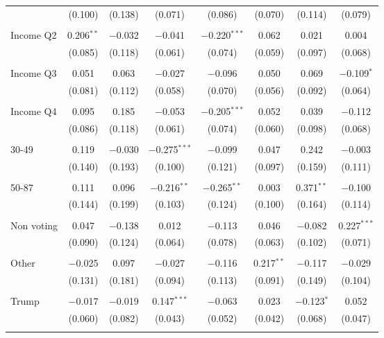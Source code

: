 \begin{tabular}{@{\extracolsep{5pt}}lccccccc}
  & (0.100) & (0.138) & (0.071) & (0.086) & (0.070) & (0.114) & (0.079) \\ 
  & & & & & & & \\ 
 Income Q2 & 0.206$^{**}$ & $-$0.032 & $-$0.041 & $-$0.220$^{***}$ & 0.062 & 0.021 & 0.004 \\ 
  & (0.085) & (0.118) & (0.061) & (0.074) & (0.059) & (0.097) & (0.068) \\ 
  & & & & & & & \\ 
 Income Q3 & 0.051 & 0.063 & $-$0.027 & $-$0.096 & 0.050 & 0.069 & $-$0.109$^{*}$ \\ 
  & (0.081) & (0.112) & (0.058) & (0.070) & (0.056) & (0.092) & (0.064) \\ 
  & & & & & & & \\ 
 Income Q4 & 0.095 & 0.185 & $-$0.053 & $-$0.205$^{***}$ & 0.052 & 0.039 & $-$0.112 \\ 
  & (0.086) & (0.118) & (0.061) & (0.074) & (0.060) & (0.098) & (0.068) \\ 
  & & & & & & & \\ 
 30-49 & 0.119 & $-$0.030 & $-$0.275$^{***}$ & $-$0.099 & 0.047 & 0.242 & $-$0.003 \\ 
  & (0.140) & (0.193) & (0.100) & (0.121) & (0.097) & (0.159) & (0.111) \\ 
  & & & & & & & \\ 
 50-87 & 0.111 & 0.096 & $-$0.216$^{**}$ & $-$0.265$^{**}$ & 0.003 & 0.371$^{**}$ & $-$0.100 \\ 
  & (0.144) & (0.199) & (0.103) & (0.124) & (0.100) & (0.164) & (0.114) \\ 
  & & & & & & & \\ 
 Non voting & 0.047 & $-$0.138 & 0.012 & $-$0.113 & 0.046 & $-$0.082 & 0.227$^{***}$ \\ 
  & (0.090) & (0.124) & (0.064) & (0.078) & (0.063) & (0.102) & (0.071) \\ 
  & & & & & & & \\ 
 Other & $-$0.025 & 0.097 & $-$0.027 & $-$0.116 & 0.217$^{**}$ & $-$0.117 & $-$0.029 \\ 
  & (0.131) & (0.181) & (0.094) & (0.113) & (0.091) & (0.149) & (0.104) \\ 
  & & & & & & & \\ 
 Trump & $-$0.017 & $-$0.019 & 0.147$^{***}$ & $-$0.063 & 0.023 & $-$0.123$^{*}$ & 0.052 \\ 
  & (0.060) & (0.082) & (0.043) & (0.052) & (0.042) & (0.068) & (0.047) \\ 
  & & & & & & & \\ 

\end{tabular}
